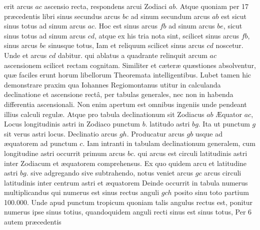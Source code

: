 \documentclass[11pt,a4paper]{article}
\begin{document}
erit arcus $ac$ ascensio recta, respondens arcui Zodiaci $ab$.
Atque quoniam per 17 præcedentis libri sinus secundus
arcus $bc$ ad sinum secundum arcus $ab$ est sicut sinus
totus ad sinum arcus $ac$. Hoc est sinus arcus $fb$ ad sinum
arcus $be$, sicut sinus totus ad sinum arcus $cd$, atque ex his
tria nota sint, scilicet sinus arcus $fb$, sinus arcus $be$ sinusque
totus, Iam et reliquum scilicet sinus arcus $cd$ noscetur.
Unde et arcus $cd$ dabitur. qui ablatus a quadrante relinquit
arcum $ac$ ascensionem scilicet rectam cognitam. Similiter et cæteræ
quæstiones absolventur, quæ faciles erunt horum libellorum
Theoremata intelligentibus. Lubet tamen hic demonstrare praxim
qua Iohannes Regiomontanus utitur in calculanda declinatione
et ascensione rectâ, per tabulas generales, nec non in habenda
differentia ascensionali. Non enim apertum est omnibus ingeniis
unde pendeant illius calculi regulæ. Atque pro tabula
declinationum sit Zodiacus $ab$ Æquator $ac$, Locus longitudinis
astri in Zodiaco punctum $b$. latitudo astri $bg$. Ita ut punctum $g$
sit verus astri locus. Declinatio arcus $gh$. Producatur arcus $gb$
usque ad æquatorem ad punctum $c$. Iam intranti in tabulam
declinationum generalem, cum longitudine astri occurrit primum
arcus $bc$. qui arcus est circuli latitudinis astri inter Zodiacum
et æquatorem comprehensus. Ex quo quidem arcu et latitudine
astri $bg$. sive adgregando sive subtrahendo, notus veniet arcus
$gc$ arcus \ill{} circuli latitudinis inter centrum astri et æquatorem
Deinde occurrit in tabula numerus multiplicandus qui numerus
est sinus rectus anguli $gch$ posito sinu toto partium 100.000.
Unde  apud punctum tropicum quoniam talis angulus rectus
est, ponitur numerus ipse sinus totius, quandoquidem
anguli recti sinus est sinus totus, Per 6 autem præcedentis
\end{document}
